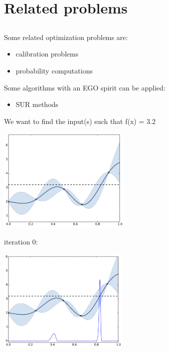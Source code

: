 \section[Related problems]{Related problems}
\subsection{}

\begin{frame}{}
Some related optimization problems are:
\begin{itemize}
	\item calibration problems
	\item probability computations
\end{itemize}
\vspace{8mm}
Some algorithms with an EGO spirit can be applied:
\begin{itemize}
 	\item SUR methods
 \end{itemize}
\end{frame}

\begin{frame}{}
We want to find the input(s) such that f(x) = 3.2
\begin{center}
\includegraphics[height=5cm]{4_optimization/figures/python/inv}
\end{center}
\end{frame}

\begin{frame}[noframenumbering]{}
iteration 0:
\begin{center}
\includegraphics[height=5cm]{4_optimization/figures/python/invproba}
\end{center}
\end{frame}

